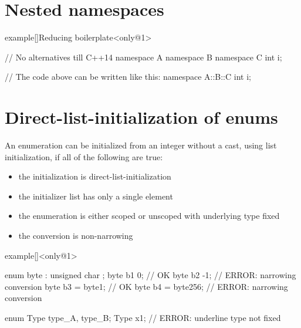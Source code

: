 \section{Nested namespaces}
\begin{frame}[fragile]{\insertsectionhead}
    \vspace{-6mm}
    \begin{varblock}{example}[\textwidth]{Reducing boilerplate}<only@1>
        \begin{Cpp}
            // No alternatives till C++14
            namespace A {
                namespace B {
                    namespace C {
                        int i;
                    }
                }
            }

            // The code above can be written like this:
            namespace A::B::C {
                int i;
            }
        \end{Cpp}
    \end{varblock}
\end{frame}

\section{Direct-list-initialization of enums}
\begin{frame}[fragile]{\insertsectionhead}
    \vspace{-3mm}
    An enumeration can be initialized from an integer without a cast, using list initialization, if all of the following are true:
    \begin{itemize}
        \small
        \item the initialization is direct-list-initialization
        \item the initializer list has only a single element
        \item the enumeration is either scoped or unscoped with underlying type fixed
        \item the conversion is non-narrowing
    \end{itemize}
    \begin{varblock}{example}[\textwidth]{}<only@1>
        \begin{Cpp}
            enum byte : unsigned char {};
            byte b1 {0};         // OK
            byte b2 {-1};        // ERROR: narrowing conversion
            byte b3 = byte{1};   // OK
            byte b4 = byte{256}; // ERROR: narrowing conversion

            enum Type {type_A, type_B};
            Type x{1};           // ERROR: underline type not fixed
        \end{Cpp}
    \end{varblock}
\end{frame}

